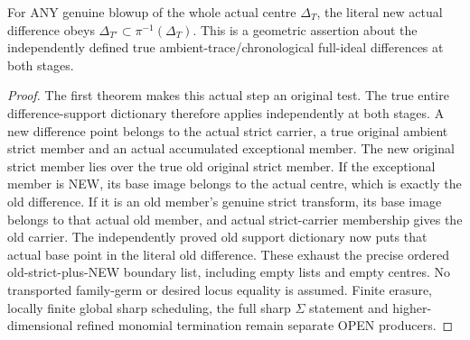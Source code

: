 \begin{theorem}
\label{hir:sharp-original-curve-new-ambient-difference-over-old-centre}
\leanok
For ANY genuine blowup of the whole actual centre $\Delta_T$, the literal
new actual difference obeys $\Delta_{T'}\subset\pi^{-1}(\Delta_T)$.
This is a geometric assertion about the independently defined true
ambient-trace/chronological full-ideal differences at both stages.
\end{theorem}
\begin{proof}
The first theorem makes this actual step an original test. The true
entire difference-support dictionary therefore applies independently
at both stages. A new difference point belongs to the actual strict
carrier, a true original ambient strict member and an actual accumulated
exceptional member. The new original strict member lies over the true
old original strict member. If the exceptional member is NEW, its base
image belongs to the actual centre, which is exactly the old difference.
If it is an old member's genuine strict transform, its base image belongs
to that actual old member, and actual strict-carrier membership gives the
old carrier. The independently proved old support dictionary now puts
that actual base point in the literal old difference. These exhaust the
precise ordered old-strict-plus-NEW boundary list, including empty lists
and empty centres. No transported family-germ or desired locus equality
is assumed. Finite erasure, locally finite global sharp scheduling, the
full sharp $\Sigma$ statement and higher-dimensional refined monomial
termination remain separate OPEN producers.
\end{proof}
